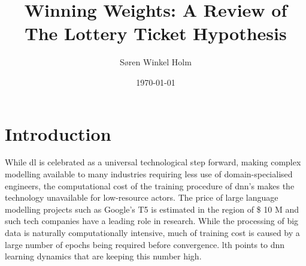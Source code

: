 \documentclass[12pt,fleqn,twocolumn]{article}
\title{Winning Weights: A Review of The Lottery Ticket Hypothesis}
\author{Søren Winkel Holm}
\date{\today}
\begin{document}
\setlength{\headheight}{15pt}
\addtolength{\topmargin}{-2.5pt}

\maketitle
\thispagestyle{fancy}

\section*{Introduction}%
\label{sec:Introduction}
While \acrfull{dl} is celebrated as a universal technological step forward, making complex modelling available to many industries requiring less use of domain-specialised engineers, the computational cost of the training procedure of \acrfull{dnn}'s makes the technology unavailable for low-resource actors.
The price of large language modelling projects such as Google's T5 is estimated in the region of \$ 10 M and such tech companies have a leading role in research.
While the processing of big data is naturally computationally intensive, much of training cost is caused by a large number of epochs being required before convergence.
\acrfull{lth} points to \acrshort{dnn} learning dynamics that are keeping this number high.
\end{document}
